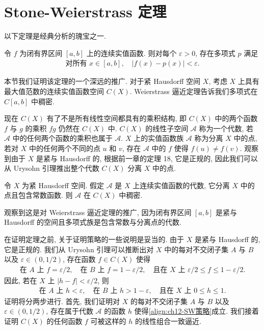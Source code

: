 \documentclass[../../main.tex]{subfiles}
\begin{document}
\section{Stone-Weierstrass 定理}\label{section:ch12-Stone-Weierstrass}

以下定理是经典分析的瑰宝之一.

\begin{theorem}\label{theorem:ch12-Weierstrass}
令 $f$ 为闭有界区间 $[a,b]$ 上的连续实值函数. 则对每个 $\varepsilon>0$, 存在多项式 $p$ 满足
\begin{align*}
\text{对所有 }x\in[a,b],\quad |f(x)-p(x)|<\varepsilon.
\end{align*}
\end{theorem}

本节我们证明该定理的一个深远的推广. 对于紧 Hausdorff 空间 $X$, 考虑 $X$ 上具有最大值范数的连续实值函数空间 $C(X)$. Weierstrass 逼近定理告诉我们多项式在 $C[a,b]$ 中稠密.

现在 $C(X)$ 有了不是所有线性空间都具有的乘积结构, 即 $C(X)$ 中的两个函数 $f$ 与 $g$ 的乘积 $fg$ 仍然在 $C(X)$ 中. $C(X)$ 的线性子空间 $\mathcal{A}$ 称为一个代数, 若 $\mathcal{A}$ 中的任何两个函数的乘积也属于 $\mathcal{A}$. $X$ 上的实值函数族 $\mathcal{A}$ 称为分离 $X$ 中的点, 若对 $X$ 中的任何两个不同的点 $u$ 和 $v$, 存在 $\mathcal{A}$ 中的 $f$ 使得 $f(u)\neq f(v)$. 观察到由于 $X$ 是紧与 Hausdorff 的, 根据前一章的定理 18, 它是正规的, 因此我们可以从 Urysohn 引理推出整个代数 $C(X)$ 分离 $X$ 中的点.

\begin{theorem}\label{theorem:ch12-Stone-Weierstrass}
令 $X$ 为紧 Hausdorff 空间. 假定 $\mathcal{A}$ 是 $X$ 上连续实值函数的代数, 它分离 $X$ 中的点且包含常数函数. 则 $\mathcal{A}$ 在 $C(X)$ 中稠密.
\end{theorem}

观察到这是对 Weierstrass 逼近定理的推广, 因为闭有界区间 $[a,b]$ 是紧与 Hausdorff 的空间且多项式族是包含常数与分离点的代数.

在证明定理之前, 关于证明策略的一些说明是妥当的. 由于 $X$ 是紧与 Hausdorff 的, 它是正规的. 我们从 Urysohn 引理可以推断出对 $X$ 中的每对不交闭子集 $A$ 与 $B$ 以及 $\varepsilon\in(0,1/2)$, 存在函数 $f\in C(X)$ 使得
\begin{align*}
\text{在 }A\text{ 上 }f=\varepsilon/2,\quad\text{在 }B\text{ 上 }f=1-\varepsilon/2,\quad\text{且在 }X\text{ 上 }\varepsilon/2\leqslant f\leqslant 1-\varepsilon/2.
\end{align*}
因此, 若在 $X$ 上 $|h-f|<\varepsilon/2$, 则
\begin{align}
\text{在 }A\text{ 上 }h<\varepsilon,\quad\text{在 }B\text{ 上 }h>1-\varepsilon,\quad\text{且在 }X\text{ 上 }0\leqslant h\leqslant 1.\label{align:ch12-SW策略}
\end{align}
证明将分两步进行. 首先, 我们证明对 $X$ 的每对不交闭子集 $A$ 与 $B$ 以及 $\varepsilon\in(0,1/2)$, 存在属于代数 $\mathcal{A}$ 的函数 $h$ 使得\eqref{align:ch12-SW策略}成立. 我们接着证明 $C(X)$ 的任何函数 $f$ 可被这样的 $h$ 的线性组合一致逼近.
\end{document}
